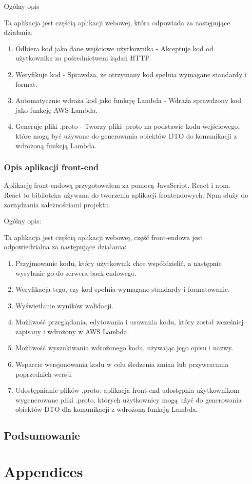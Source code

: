 \documentclass[runningheads,12pt]{llncs}
\begin{document}
Ogólny opis

Ta aplikacja jest częścią aplikacji webowej, która odpowiada za następujące działania:
\begin{enumerate}
    \item Odbiera kod jako dane wejściowe użytkownika - Akceptuje kod od użytkownika za pośrednictwem żądań HTTP.
    \item Weryfikuje kod - Sprawdza, że otrzymany kod spełnia wymagane standardy i format.
    \item Automatycznie wdraża kod jako funkcję Lambda -  Wdraża sprawdzony kod jako funkcję AWS Lambda.
    \item Generuje pliki .proto - Tworzy pliki .proto na podstawie kodu wejściowego, które mogą być używane do generowania obiektów DTO do komunikacji z wdrożoną funkcją Lambda.
\end{enumerate}


\subsubsection{Opis aplikacji front-end}

Aplikację front-endową przygotowałem za pomocą JavaScript, React i npm.
React to biblioteka używana do tworzenia aplikacji frontendowych.  
Npm służy do zarządzania zależnościami projektu.

Ogólny opis:

Ta aplikacja jest częścią aplikacji webowej, część front-endowa jest odpowiedzialna za następujące działania:
\begin{enumerate}
    \item Przyjmowanie kodu, który użytkownik chce współdzielić, a następnie wysyłanie go do serwera back-endowego.
    \item Weryfikacja tego, czy kod spełnia wymagane standardy i formatowanie.
    \item Wyświetlanie wyników walidacji.
    \item Możliwość przeglądania, edytowania i usuwania kodu, który został wcześniej zapisany i wdrożony w AWS Lambda.
    \item Możliwość wyszukiwania wdrożonego kodu, używając jego opisu i nazwy.
    \item Wsparcie wersjonowania kodu w celu śledzenia zmian lub przywracania poprzednich wersji.
    \item Udostępnianie plików .proto: aplikacja front-end udostępnia użytkownikom wygenerowane pliki .proto, których użytkownicy mogą użyć do generowania obiektów DTO dla komunikacji z wdrożoną funkcją Lambda.
\end{enumerate}

\subsection{Podsumowanie}

\nocite{*}

\listoftables

\listoffigures




\section{Appendices}
\end{document}
